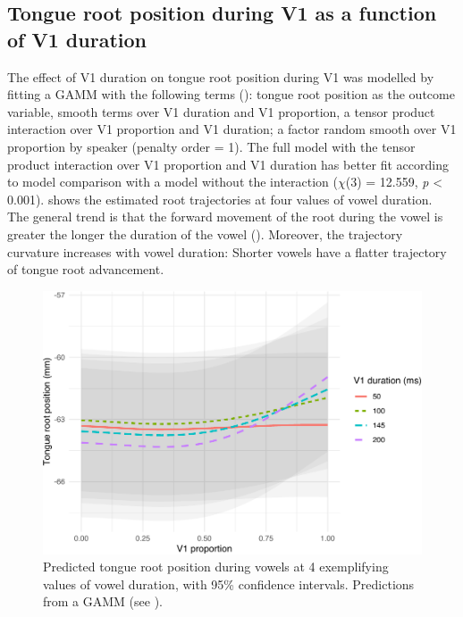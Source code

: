 \documentclass[preprint]{JASAnew}
\begin{document}
\hypertarget{tongue-root-position-during-v1-as-a-function-of-v1-duration}{%
\subsection{Tongue root position during V1 as a function of V1
duration}\label{tongue-root-position-during-v1-as-a-function-of-v1-duration}}

\label{s:trp-v1-dur}

The effect of V1 duration on tongue root position during V1 was modelled
by fitting a GAMM with the following terms
(): tongue root position as the outcome
variable, smooth terms over V1 duration and V1 proportion, a tensor
product interaction over V1 proportion and V1 duration; a factor random
smooth over V1 proportion by speaker (penalty order = 1). The full model
with the tensor product interaction over V1 proportion and V1 duration
has better fit according to model comparison with a model without the
interaction (\(\chi\)(3) = 12.559, \emph{p} \textless{} 0.001).
 shows the estimated root trajectories at four values of
vowel duration. The general trend is that the forward movement of the
root during the vowel is greater the longer the duration of the vowel
(). Moreover, the trajectory curvature increases with
vowel duration: Shorter vowels have a flatter trajectory of tongue root
advancement.

\begin{figure}
\includegraphics[width=\linewidth]{./Figure5-1} \caption{Predicted tongue root position during vowels at 4 exemplifying values of vowel duration, with 95\% confidence intervals. Predictions from a GAMM (see ).}\label{f:Figure5}
\end{figure}
\end{document}
